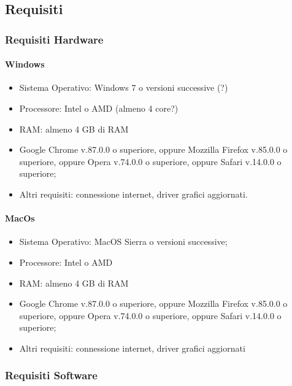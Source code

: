 \documentclass[../manuale_sviluppatore.tex]{subfiles}
\begin{document}
\subsection{Requisiti}
    \label{sec:requisiti}
\subsubsection{Requisiti Hardware}
    \label{subsub:req_h}

\paragraph{Windows}
    \label{par:Windows_req}

\begin{itemize}
    \item Sistema Operativo: Windows 7 o versioni successive (?)
    \item Processore: Intel o AMD (almeno 4 core?)
    \item RAM: almeno 4 GB di RAM
    \item Google Chrome v.87.0.0 o superiore, oppure Mozzilla Firefox v.85.0.0 o superiore, oppure Opera v.74.0.0 o superiore, oppure Safari v.14.0.0 o superiore;
    \item Altri requisiti: connessione internet, driver grafici aggiornati.
\end{itemize}

\paragraph{MacOs}
    \label{par:mac_req}

\begin{itemize}
    \item Sistema Operativo: MacOS Sierra o versioni successive;
    \item Processore: Intel o AMD
    \item RAM: almeno 4 GB di RAM
    \item Google Chrome v.87.0.0 o superiore, oppure Mozzilla Firefox v.85.0.0 o superiore, oppure Opera v.74.0.0 o superiore, oppure Safari v.14.0.0 o superiore;
    \item Altri requisiti: connessione internet, driver grafici aggiornati
\end{itemize}

\subsubsection{Requisiti Software}
    \label{subsub:req_s}
\end{document}
